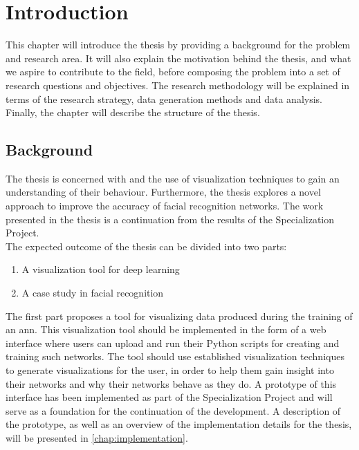 \chapter{Introduction}

This chapter will introduce the thesis by providing a background for the problem and research area. It will also explain the motivation behind the thesis, and what we aspire to contribute to the field, before composing the problem into a set of research questions and objectives. The research methodology will be explained in terms of the research strategy, data generation methods and data analysis. Finally, the chapter will describe the structure of the thesis.

\section{Background}

\noindent The thesis is concerned with  and the use of visualization techniques to gain an understanding of their behaviour. Furthermore, the thesis explores a novel approach to improve the accuracy of facial recognition networks. The work presented in the thesis is a continuation from the results of the Specialization Project. \\

\noindent The expected outcome of the thesis can be divided into two parts:
\begin{enumerate}
    \item A visualization tool for deep learning
    \item A case study in facial recognition
\end{enumerate}

\noindent The first part proposes a tool for visualizing data produced during the training of an \acrshort{ann}. This visualization tool should be implemented in the form of a web interface where users can upload and run their Python scripts for creating and training such networks. The tool should use established visualization techniques to generate visualizations for the user, in order to help them gain insight into their networks and why their networks behave as they do. A prototype of this interface has been implemented as part of the Specialization Project and will serve as a foundation for the continuation of the development. A description of the prototype, as well as an overview of the implementation details for the thesis, will be presented in \autoref{chap:implementation}. \\

